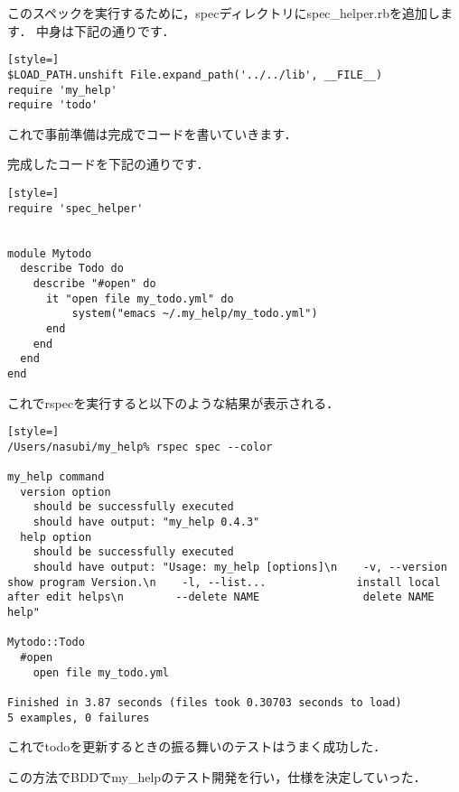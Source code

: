 このスペックを実行するために，specディレクトリにspec\_helper.rbを追加します．
中身は下記の通りです．
\begin{lstlisting}[style=]
$LOAD_PATH.unshift File.expand_path('../../lib', __FILE__)
require 'my_help'
require 'todo'
\end{lstlisting}
これで事前準備は完成でコードを書いていきます．

完成したコードを下記の通りです．
\begin{lstlisting}[style=]
require 'spec_helper'


module Mytodo
  describe Todo do
    describe "#open" do
      it "open file my_todo.yml" do
          system("emacs ~/.my_help/my_todo.yml")
      end
    end
  end
end

\end{lstlisting}
これでrspecを実行すると以下のような結果が表示される．
\begin{lstlisting}[style=]
/Users/nasubi/my_help% rspec spec --color

my_help command
  version option
    should be successfully executed
    should have output: "my_help 0.4.3"
  help option
    should be successfully executed
    should have output: "Usage: my_help [options]\n    -v, --version                    show program Version.\n    -l, --list...              install local after edit helps\n        --delete NAME                delete NAME help"

Mytodo::Todo
  #open
    open file my_todo.yml

Finished in 3.87 seconds (files took 0.30703 seconds to load)
5 examples, 0 failures

\end{lstlisting}
これでtodoを更新するときの振る舞いのテストはうまく成功した．

この方法でBDDでmy\_helpのテスト開発を行い，仕様を決定していった．


